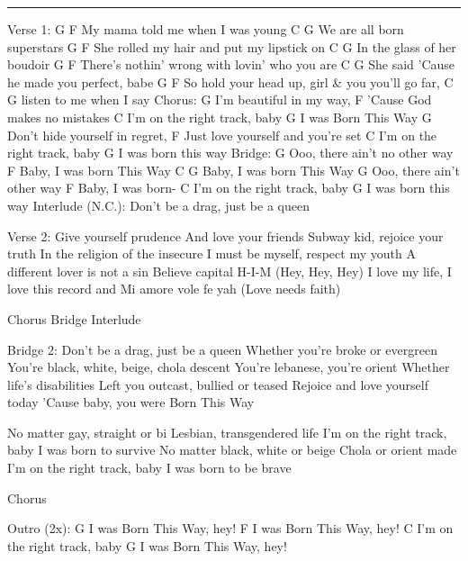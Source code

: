 \noindent\rule{\columnwidth}{1pt}

\begin{multicols}{2}
\begin{lstsong}
Verse 1:
G                    F
My mama told me when I was young
C                    G 
We are all born superstars
G                      F
She rolled my hair and put my lipstick on
C                      G 
In the glass of her boudoir
G                           F
There's nothin' wrong with lovin' who you are
C           G 
She said 'Cause he made you perfect, babe
G                      F
So hold your head up, girl & you you'll go far,
C                    G 
listen to me when I say
Chorus:
    G 
I'm beautiful in my way,
       F
'Cause God makes no mistakes
           C
I'm on the right track, baby
      G 
I was Born This Way
           G 
Don't hide yourself in regret,
          F
Just love yourself and you're set
           C
I'm on the right track, baby
      G 
I was born this way
Bridge:
G 
Ooo, there ain't no other way
F
Baby, I was born This Way
C          G 
Baby, I was born This Way
G 
Ooo, there ain't other way
F
Baby, I was born-
           C
I'm on the right track, baby
      G 
I was born this way
Interlude (N.C.): Don't be a drag, just be a queen

Verse 2:
Give yourself prudence
And love your friends
Subway kid, rejoice your truth
In the religion of the insecure
I must be myself, respect my youth
A different lover is not a sin
Believe capital H-I-M (Hey, Hey, Hey)
I love my life, I love this record and
Mi amore vole fe yah (Love needs faith)

Chorus
Bridge
Interlude

Bridge 2:
Don't be a drag, just be a queen
Whether you're broke or evergreen
You're black, white, beige, chola descent
You're lebanese, you're orient
Whether life's disabilities
Left you outcast, bullied or teased
Rejoice and love yourself today
'Cause baby, you were Born This Way

No matter gay, straight or bi
Lesbian, transgendered life
I'm on the right track, baby
I was born to survive
No matter black, white or beige
Chola or orient made
I'm on the right track, baby
I was born to be brave

Chorus

Outro (2x):
      G 
I was Born This Way, hey!
      F
I was Born This Way, hey!
           C
I'm on the right track, baby
      G 
I was Born This Way, hey!
\end{lstsong}
\end{multicols}
\newpage

